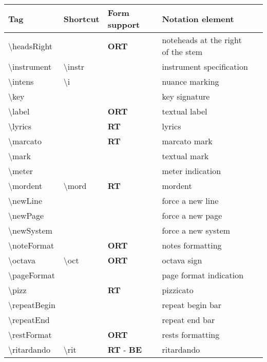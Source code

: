 \documentclass[a4paper, landscape, 11pt]{article}
\begin{document}
%
\begin{tabularx}{\linewidth}{p{3cm}p{5cm}lll}
    \hline
    \textbf{Tag}&\textbf{Shortcut}&\textbf{Form support}&\textbf{Notation element}&\textbf{ %
    }\\
    \hline
    \textbackslash{}headsRight&&\textbf{ORT}&noteheads at the right of the stem&\\
    \hline
    \textbackslash{}instrument&\textbackslash{}instr&&instrument specification&\\
    \hline
    \textbackslash{}intens&\textbackslash{}i&&nuance marking&\\
    \hline
    \textbackslash{}key&&&key signature&\\
    \hline
    \textbackslash{}label&&\textbf{ORT}&textual label&\\
    \hline
    \textbackslash{}lyrics&&\textbf{RT}&lyrics&\\
    \hline
    \textbackslash{}marcato&&\textbf{RT}&marcato mark&\\
    \hline
    \textbackslash{}mark&&&textual mark&\\
    \hline
    \textbackslash{}meter&&&meter indication&\\
    \hline
    \textbackslash{}mordent&\textbackslash{}mord&\textbf{RT}&mordent&\\
    \hline
    \textbackslash{}newLine&&&force a new line&\\
    \hline
    \textbackslash{}newPage&&&force a new page&\\
    \hline
    \textbackslash{}newSystem&&&force a new system&\\
    \hline
    \textbackslash{}noteFormat&&\textbf{ORT}&notes formatting&\\
    \hline
    \textbackslash{}octava&\textbackslash{}oct&\textbf{ORT}&octava sign&\\ %
    \hline
    \textbackslash{}pageFormat&&&page format indication&\\
    \hline
    \textbackslash{}pizz&&\textbf{RT}&pizzicato&\\
    \hline
    \textbackslash{}repeatBegin&&&repeat begin bar&\\
    \hline
    \textbackslash{}repeatEnd&&&repeat end bar&\\
    \hline
    \textbackslash{}restFormat&&\textbf{ORT}&rests formatting&\\
    \hline
    \textbackslash{}ritardando&\textbackslash{}rit&\textbf{RT} - \textbf{BE}&ritardando&\\

\end{tabularx}
\end{document}
